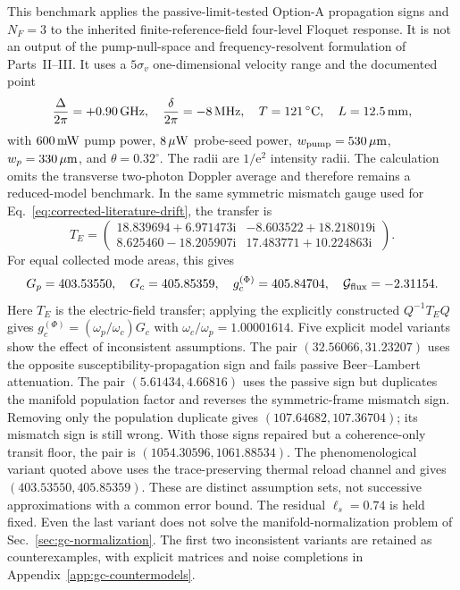 \documentclass[11pt,a4paper]{article}
\newcommand{\ii}{\mathrm i}
\newcommand{\e}{\mathrm e}
\newcommand{\GHz}{\,\mathrm{GHz}}
\newcommand{\MHz}{\,\mathrm{MHz}}
\newcommand{\degC}{\,^{\circ}\mathrm C}
\begin{document}
This benchmark applies the passive-limit-tested Option-A propagation signs and
$N_F=3$ to the inherited finite-reference-field four-level Floquet response.
It is not an output of the pump-null-space and frequency-resolvent formulation
of Parts~II--III. It uses
a $5\sigma_v$ one-dimensional velocity range and the documented point
\[
\frac{\Delta}{2\pi}=+0.90\GHz,\quad
\frac{\delta}{2\pi}=-8\MHz,\quad T=121\degC,\quad L=12.5\,{\rm mm},
\]
with $600\,{\rm mW}$ pump power, $8\,\mu{\rm W}$ probe-seed power,
$w_{\rm pump}=530\,\mu{\rm m}$, $w_p=330\,\mu{\rm m}$, and
$\theta=0.32^\circ$. The radii are $1/\e^2$ intensity radii.
The calculation omits the transverse two-photon Doppler average and
therefore remains a reduced-model benchmark. In the same symmetric mismatch
gauge used for Eq.~\eqref{eq:corrected-literature-drift}, the transfer is
\[
T_E=
\begin{pmatrix}
18.839694+6.971473\ii&-8.603522+18.218019\ii\\
8.625460-18.205907\ii&17.483771+10.224863\ii
\end{pmatrix}.
\]
For equal collected mode areas, this gives
\[
G_p=403.53550,\quad G_c=405.85359,\quad
g_c^{(\Phi)}=405.84704,\quad \mathcal G_{\rm flux}=-2.31154.
\]
Here $T_E$ is the electric-field transfer; applying the explicitly constructed
$Q^{-1}T_EQ$ gives $g_c^{(\Phi)}=(\omega_p/\omega_c)G_c$ with
$\omega_c/\omega_p=1.00001614$. Five explicit model variants show the effect of inconsistent assumptions.
The pair $(32.56066,31.23207)$ uses the opposite susceptibility-propagation
sign and fails passive Beer--Lambert attenuation. The pair
$(5.61434,4.66816)$ uses the passive sign but duplicates the manifold population
factor and reverses the symmetric-frame mismatch sign. Removing only the
population duplicate gives $(107.64682,107.36704)$; its mismatch sign is still
wrong. With those signs repaired but a coherence-only transit floor, the
pair is $(1054.30596,1061.88534)$. The phenomenological variant quoted above
uses the trace-preserving thermal reload channel and gives
$(403.53550,405.85359)$. These are distinct assumption sets, not successive
approximations with a common error bound. The residual $\ell_s=0.74$ is held
fixed. Even the last variant does not solve the manifold-normalization
problem of Sec.~\ref{sec:gc-normalization}. The first two inconsistent
variants are retained as counterexamples, with explicit matrices and noise
completions in Appendix~\ref{app:gc-countermodels}.
\end{document}
